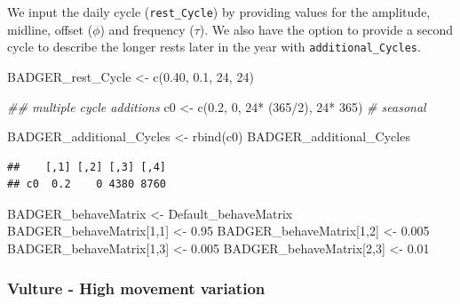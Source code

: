 \documentclass[10pt,a4paper]{article}
\newenvironment{Shaded}{}{}
\newcommand{\CommentTok}[1]{\textit{#1}}
\newcommand{\DecValTok}[1]{#1}
\newcommand{\DocumentationTok}[1]{\textit{#1}}
\newcommand{\FloatTok}[1]{#1}
\newcommand{\FunctionTok}[1]{#1}
\newcommand{\NormalTok}[1]{#1}
\newcommand{\OtherTok}[1]{#1}
\newcommand{\SpecialCharTok}[1]{#1}
\begin{document}
We input the daily cycle (\texttt{rest\_Cycle}) by providing values for the amplitude, midline, offset (\(\phi\)) and frequency (\(\tau\)).
We also have the option to provide a second cycle to describe the longer rests later in the year with \texttt{additional\_Cycles}.

\begin{Shaded}
\begin{Highlighting}[]
\NormalTok{BADGER\_rest\_Cycle }\OtherTok{\textless{}{-}} \FunctionTok{c}\NormalTok{(}\FloatTok{0.40}\NormalTok{, }\FloatTok{0.1}\NormalTok{, }\DecValTok{24}\NormalTok{, }\DecValTok{24}\NormalTok{)}

\DocumentationTok{\#\# multiple cycle additions}
\NormalTok{c0 }\OtherTok{\textless{}{-}} \FunctionTok{c}\NormalTok{(}\FloatTok{0.2}\NormalTok{, }\DecValTok{0}\NormalTok{, }\DecValTok{24}\SpecialCharTok{*}\NormalTok{ (}\DecValTok{365}\SpecialCharTok{/}\DecValTok{2}\NormalTok{), }\DecValTok{24}\SpecialCharTok{*} \DecValTok{365}\NormalTok{) }\CommentTok{\# seasonal}

\NormalTok{BADGER\_additional\_Cycles }\OtherTok{\textless{}{-}} \FunctionTok{rbind}\NormalTok{(c0)}
\NormalTok{BADGER\_additional\_Cycles}
\end{Highlighting}
\end{Shaded}

\begin{verbatim}
##    [,1] [,2] [,3] [,4]
## c0  0.2    0 4380 8760
\end{verbatim}

\begin{Shaded}
\begin{Highlighting}[]
\NormalTok{BADGER\_behaveMatrix }\OtherTok{\textless{}{-}}\NormalTok{ Default\_behaveMatrix}
\NormalTok{BADGER\_behaveMatrix[}\DecValTok{1}\NormalTok{,}\DecValTok{1}\NormalTok{] }\OtherTok{\textless{}{-}} \FloatTok{0.95}
\NormalTok{BADGER\_behaveMatrix[}\DecValTok{1}\NormalTok{,}\DecValTok{2}\NormalTok{] }\OtherTok{\textless{}{-}} \FloatTok{0.005}
\NormalTok{BADGER\_behaveMatrix[}\DecValTok{1}\NormalTok{,}\DecValTok{3}\NormalTok{] }\OtherTok{\textless{}{-}} \FloatTok{0.005}
\NormalTok{BADGER\_behaveMatrix[}\DecValTok{2}\NormalTok{,}\DecValTok{3}\NormalTok{] }\OtherTok{\textless{}{-}} \FloatTok{0.01}
\end{Highlighting}
\end{Shaded}

\hypertarget{vulture---high-movement-variation}{%
\subsubsection{Vulture - High movement variation}\label{vulture---high-movement-variation}}
\end{document}
